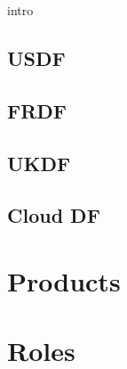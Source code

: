  {intro}







\subsection{USDF}
\subsection{FRDF}
\subsection{UKDF}
\subsection{Cloud DF}

\section{Products}

\section{Roles}

